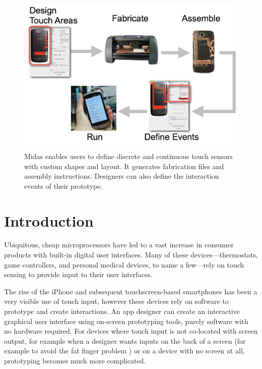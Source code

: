 \begin{figure}
\centering
\includegraphics[width=\textwidth]{figures/midas/overview.png}
\caption{Midas enables users to define discrete and continuous touch sensors with custom shapes and layout. It generates fabrication files and assembly instructions. Designers can also define the interaction events of their prototype.}
\label{fig:midas-overview}
\end{figure}

\section{Introduction}


Ubiquitous, cheap microprocessors have led to a vast increase in consumer products with built-in digital user interfaces. Many of these devices---thermostats, game controllers, and personal medical devices, to name a few---rely on touch sensing to provide input to their user interfaces.

The rise of the iPhone and subsequent touchscreen-based smartphones has been a very visible use of touch input, however these devices rely on software to prototype and create interactions. An app designer can create an interactive graphical user interface using on-screen prototyping tools, purely software with no hardware required. For devices where touch input is not co-located with screen output, for example when a designer wants inputs on the back of a screen (for example to avoid the fat finger problem \cite{baudisch-nanotouch}) or on a device with no screen at all, prototyping becomes much more complicated.

